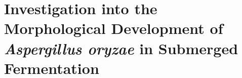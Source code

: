 \def \adx {a_{D/X}}

\chapter{Investigation into the Morphological Development of \emph{Aspergillus oryzae} in Submerged Fermentation}







